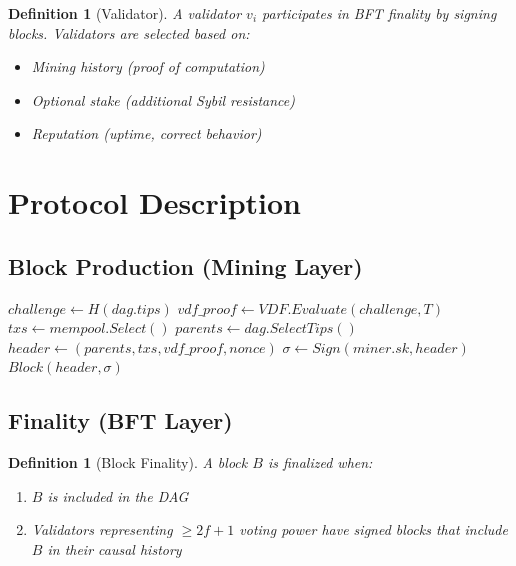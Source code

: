 \documentclass[11pt,a4paper]{article}
\newtheorem{definition}[theorem]{Definition}
\begin{document}
\begin{definition}[Validator]
A validator $v_i$ participates in BFT finality by signing blocks. Validators are selected based on:
\begin{itemize}
    \item Mining history (proof of computation)
    \item Optional stake (additional Sybil resistance)
    \item Reputation (uptime, correct behavior)
\end{itemize}
\end{definition}

\section{Protocol Description}

\subsection{Block Production (Mining Layer)}

\begin{algorithm}
\caption{Q-NarwhalKnight Block Production}
\begin{algorithmic}[1]
    \State $challenge \gets H(dag.tips)$ 
    \State $vdf\_proof \gets VDF.Evaluate(challenge, T)$ 
    \State $txs \gets mempool.Select()$
    \State $parents \gets dag.SelectTips()$ 
        \State $header \gets (parents, txs, vdf\_proof, nonce)$
            \State $\sigma \gets Sign(miner.sk, header)$
            \State \Return $Block(header, \sigma)$
        \EndIf
    \EndFor
\EndFunction
\end{algorithmic}
\end{algorithm}

\subsection{Finality (BFT Layer)}

\begin{definition}[Block Finality]
A block $B$ is \emph{finalized} when:
\begin{enumerate}
    \item $B$ is included in the DAG
    \item Validators representing $\geq 2f+1$ voting power have signed blocks that include $B$ in their causal history
\end{enumerate}
\end{definition}
\end{document}
